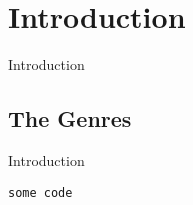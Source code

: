\chapter{Introduction}

Introduction

\section{The Genres}

Introduction

\begin{lstlisting}[title=intro.clj]
some code
\end{lstlisting}